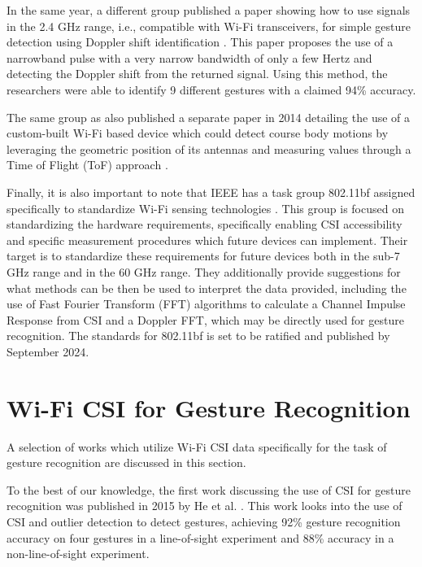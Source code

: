 In the same year, a different group published a paper showing how to use signals in the 2.4 GHz range, i.e., compatible with Wi-Fi transceivers, for simple gesture detection using Doppler shift identification \cite{pu2013whole}.
This paper proposes the use of a narrowband pulse with a very narrow bandwidth of only a few Hertz and detecting the Doppler shift from the returned signal.
Using this method, the researchers were able to identify 9 different gestures with a claimed 94\% accuracy.

The same group as \cite{adib2013see} also published a separate paper in 2014 detailing the use of a custom-built Wi-Fi based device which could detect course body motions by leveraging the geometric position of its antennas and measuring values through a Time of Flight (ToF) approach \cite{adib20143d}.

Finally, it is also important to note that IEEE has a task group 802.11bf assigned specifically to standardize Wi-Fi sensing technologies \cite{du2022overview}.
This group is focused on standardizing the hardware requirements, specifically enabling CSI accessibility and specific measurement procedures which future devices can implement.
Their target is to standardize these requirements for future devices both in the sub-7 GHz range and in the 60 GHz range.
They additionally provide suggestions for what methods can be then be used to interpret the data provided, including the use of Fast Fourier Transform (FFT) algorithms to calculate a Channel Impulse Response from CSI and a Doppler FFT, which may be directly used for gesture recognition.
The standards for 802.11bf is set to be ratified and published by September 2024.

\section{Wi-Fi CSI for Gesture Recognition}

A selection of works which utilize Wi-Fi CSI data specifically for the task of gesture recognition are discussed in this section.

To the best of our knowledge, the first work discussing the use of CSI for gesture recognition was published in 2015 by He et al. \cite{he2015wig}.
This work looks into the use of CSI and outlier detection to detect gestures, achieving 92\% gesture recognition accuracy on four gestures in a line-of-sight experiment and 88\% accuracy in a non-line-of-sight experiment.

